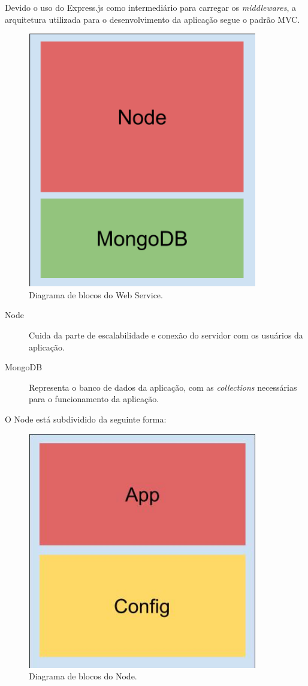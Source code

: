 \documentclass[
	12pt,				%
	oneside,			%
	a4paper,			%
	brazil				%
]{abntex2}
\begin{document}
{Devido o uso do Express.js como intermediário para carregar os \textit{middlewares}, a arquitetura utilizada para o desenvolvimento da aplicação segue o padrão MVC.

\begin{figure}[h]
\centering
\includegraphics[width=10cm, center]{images/brick_diagram_framework_webservice}
\caption{Diagrama de blocos do Web Service.}
\label{Rotulo}
\end{figure}

\begin{description}
\item[Node] Cuida da parte de escalabilidade e conexão do servidor com os usuários da aplicação.
\item[MongoDB] Representa o banco de dados da aplicação, com as \textit{collections} necessárias para o funcionamento da aplicação.
\end{description}

O Node está subdividido da seguinte forma:

\begin{figure}[h]
\centering
\includegraphics[width=10cm, center]{images/brick_diagram_node}
\caption{Diagrama de blocos do Node.}
\label{Rotulo}
\end{figure}

}
\end{document}
